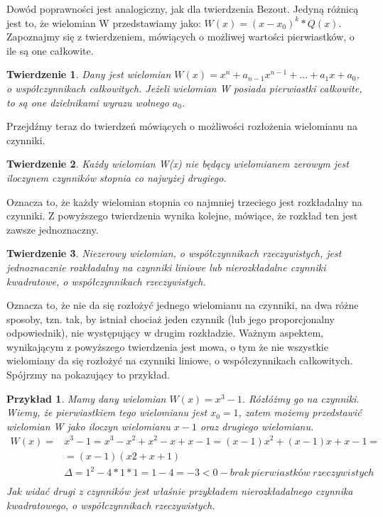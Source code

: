 \documentclass[twoside,a4paper]{book}
\newtheorem{theorem}{Twierdzenie}
\newtheorem{example}{Przykład}
\begin{document}
Dowód poprawności jest analogiczny, jak dla twierdzenia Bezout. Jedyną różnicą jest to, że wielomian W przedstawiamy jako: $W(x) = (x-x_0)^k * Q(x)$. Zapoznajmy się z twierdzeniem, mówiących o możliwej wartości pierwiastków, o ile są one całkowite.

\begin{theorem}
	Dany jest wielomian $W(x) = x^n + a_{n-1}x^{n-1} + ... + a_1x + a_0$, o współczynnikach całkowitych. Jeżeli wielomian W posiada pierwiastki całkowite, to są one dzielnikami wyrazu wolnego $a_0$.
\end{theorem}

Przejdźmy teraz do twierdzeń mówiących o możliwości rozłożenia wielomianu na czynniki.

\begin{theorem}
	Każdy wielomian W(x) nie będący wielomianem zerowym jest iloczynem czynników stopnia co najwyżej drugiego.
\end{theorem}

Oznacza to, że każdy wielomian stopnia co najmniej trzeciego jest rozkładalny na czynniki. Z powyższego twierdzenia wynika kolejne, mówiące, że rozkład ten jest zawsze jednoznaczny.

\begin{theorem}
	Niezerowy wielomian, o współczynnikach rzeczywistych, jest jednoznacznie rozkładalny na czynniki liniowe lub nierozkładalne czynniki kwadratowe, o współczynnikach rzeczywistych.
\end{theorem}

Oznacza to, że nie da się rozłożyć jednego wielomianu na czynniki, na dwa różne sposoby, tzn. tak, by istniał chociaż jeden czynnik (lub jego proporcjonalny odpowiednik), nie występujący w drugim rozkładzie. Ważnym aspektem, wynikającym z powyższego twierdzenia jest mowa, o tym że nie wszystkie wielomiany da się rozłożyć na czynniki liniowe, o współczynnikach całkowitych. Spójrzmy na pokazujący to przykład.

\begin{example}
	Mamy dany wielomian $W(x)=x^3-1$. Rózłóżmy go na czynniki.
	Wiemy, że pierwiastkiem tego wielomianu jest $x_0 = 1$, zatem możemy przedstawić wielomian W jako iloczyn wielomianu $x-1$ oraz drugiego wielomianu.
	\begin{equation}
	\begin{split}
	W(x)=&x^3-1=x^3-x^2+x^2-x+x-1=(x-1)x^2+(x-1)x+x-1 = \\
	&=(x-1)(x2+x+1) \\
	&\Delta = 1^2 - 4*1*1 = 1 - 4 = -3 < 0 - brak\ pierwiastków\ rzeczywistych\\
	\end{split}
	\end{equation}
	Jak widać drugi z czynników jest właśnie przykładem nierozkładalnego czynnika kwadratowego, o współczynnikach rzeczywistych.
\end{example}
\end{document}
